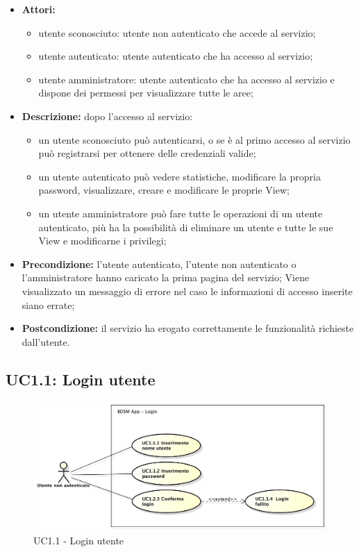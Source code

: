 \begin{itemize}
    \item \textbf{Attori:}
    \begin{itemize}
    	\item utente sconosciuto: utente non autenticato che accede al servizio;
    	\item utente autenticato: utente autenticato che ha accesso al servizio;
    	\item utente amministratore: utente autenticato che ha accesso al servizio e dispone dei permessi per visualizzare tutte le aree;
	\end{itemize}
    \item \textbf{Descrizione:} dopo l'accesso al servizio:
    \begin{itemize}
    	\item un utente sconosciuto può autenticarsi, o se è al primo accesso al servizio può registrarsi per ottenere delle credenziali valide;
    	\item un utente autenticato può vedere statistiche, modificare la propria password, visualizzare, creare e modificare le proprie View;
  		\item un utente amministratore può fare tutte le operazioni di un utente autenticato, più ha la possibilità di eliminare un utente e tutte le sue View e modificarne i privilegi;
	\end{itemize}
    \item \textbf{Precondizione:} l'utente autenticato, l'utente non autenticato o l'amministratore hanno caricato la prima pagina del servizio;
    Viene visualizzato un messaggio di errore nel caso le informazioni di accesso inserite siano errate;
    \item \textbf{Postcondizione:} il servizio ha erogato correttamente le funzionalità richieste dall'utente.
\end{itemize}

\subsection{UC1.1: Login utente}

\begin{figure}[htbp]
    \centering
    \centerline{\includegraphics[scale=0.5]{./images/UC1_1.pdf}}
    \caption{UC1.1 - Login utente}
\end{figure}

